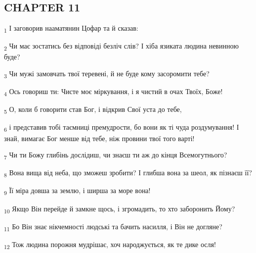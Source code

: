 \subsection{CHAPTER 11}
\begin{tcolorbox}
\textsubscript{1} І заговорив нааматянин Цофар та й сказав:
\end{tcolorbox}
\begin{tcolorbox}
\textsubscript{2} Чи має зостатись без відповіді безліч слів? І хіба язиката людина невинною буде?
\end{tcolorbox}
\begin{tcolorbox}
\textsubscript{3} Чи мужі замовчать твої теревені, й не буде кому засоромити тебе?
\end{tcolorbox}
\begin{tcolorbox}
\textsubscript{4} Ось говориш ти: Чисте моє міркування, і я чистий в очах Твоїх, Боже!
\end{tcolorbox}
\begin{tcolorbox}
\textsubscript{5} О, коли б говорити став Бог, і відкрив Свої уста до тебе,
\end{tcolorbox}
\begin{tcolorbox}
\textsubscript{6} і представив тобі таємниці премудрости, бо вони як ті чуда роздумування! І знай, вимагає Бог менше від тебе, ніж провини твої того варті!
\end{tcolorbox}
\begin{tcolorbox}
\textsubscript{7} Чи ти Божу глибінь дослідиш, чи знаєш ти аж до кінця Всемогутнього?
\end{tcolorbox}
\begin{tcolorbox}
\textsubscript{8} Вона вища від неба, що зможеш зробити? І глибша вона за шеол, як пізнаєш її?
\end{tcolorbox}
\begin{tcolorbox}
\textsubscript{9} Її міра довша за землю, і ширша за море вона!
\end{tcolorbox}
\begin{tcolorbox}
\textsubscript{10} Якщо Він перейде й замкне щось, і згромадить, то хто заборонить Йому?
\end{tcolorbox}
\begin{tcolorbox}
\textsubscript{11} Бо Він знає нікчемності людські та бачить насилля, і Він не догляне?
\end{tcolorbox}
\begin{tcolorbox}
\textsubscript{12} Тож людина порожня мудрішає, хоч народжується, як те дике осля!
\end{tcolorbox}
